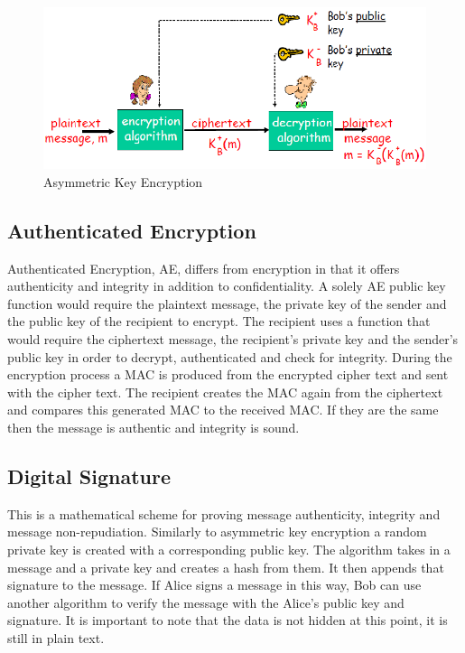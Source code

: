 \begin{figure}[H]
	\centering
	\includegraphics[width=1\linewidth]{Figures/publickeyex.png}
	\caption{Asymmetric Key Encryption}
	\label{fig:asy}
\end{figure}

\subsection{Authenticated Encryption}

Authenticated Encryption, AE, differs from encryption in that it offers authenticity and integrity in addition to confidentiality. A solely AE public key function would require the plaintext message, the private key of the sender and the public key of the recipient to encrypt. The recipient uses a function that would require the ciphertext message, the recipient's private key and the sender's public key in order to decrypt, authenticated and check for integrity. During the encryption process a MAC is produced from the encrypted cipher text and sent with the cipher text. The recipient creates the MAC again from the ciphertext and compares this generated MAC to the received MAC. If they are the same then the message is authentic and integrity is sound. 

\subsection{Digital Signature}

This is a mathematical scheme for proving message authenticity, integrity and message non-repudiation. Similarly to asymmetric key encryption a random private key is created with a corresponding public key. The algorithm takes in a message and a private key and creates a hash from them. It then appends that signature to the message. If Alice signs a message in this way, Bob can use another algorithm to verify the message with the Alice's public key and signature. It is important to note that the data is not hidden at this point, it is still in plain text.

